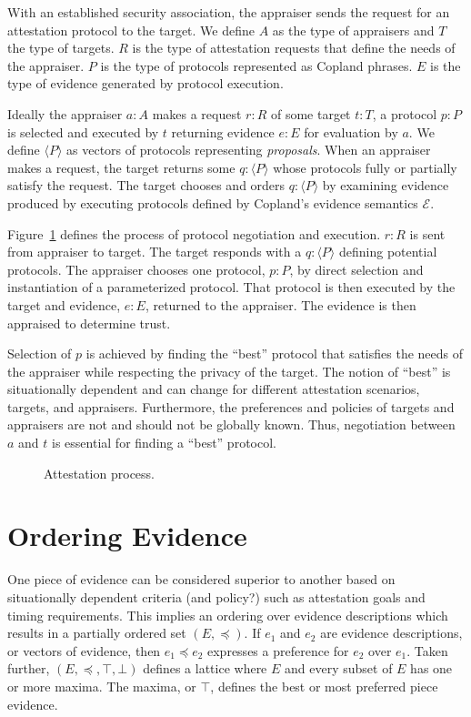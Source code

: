 \documentclass[sigconf,authordraft]{acmart}
\begin{document}
With an established security association, the appraiser sends the request for an attestation protocol to the target.  We
define $A$ as the type of appraisers and $T$ the type of targets.  $R$
is the type of attestation requests that define the needs of the
appraiser.  $P$ is the type of protocols represented as Copland
phrases.  $E$ is the type of evidence generated by protocol execution.

Ideally the appraiser $a:A$ makes a request $r:R$ of some target
$t:T$, a protocol $p:P$ is selected and executed by $t$ returning
evidence $e:E$ for evaluation by $a$. We define $\langle P \rangle$ as
vectors of protocols representing \emph{proposals}.  When an appraiser
makes a request, the target returns some $q:\langle P \rangle$ whose
protocols fully or partially satisfy the request. The target chooses
and orders $q:\langle P\rangle$ by examining evidence produced by
executing protocols defined by Copland's evidence semantics
$\mathcal{E}$.

Figure~\ref{fig:sequence-fig} defines the process of protocol
negotiation and execution.  $r:R$ is sent from appraiser to target.
The target responds with a $q:\langle P\rangle$ defining potential
protocols.  The appraiser chooses one protocol, $p:P$, by direct
selection and instantiation of a parameterized protocol.  That
protocol is then executed by the target and evidence, $e:E$, returned
to the appraiser.  The evidence is then appraised to determine trust.

Selection of $p$ is achieved by finding the ``best'' protocol that
satisfies the needs of the appraiser while respecting the privacy of
the target. The notion of ``best'' is situationally dependent and can
change for different attestation scenarios, targets, and appraisers.
Furthermore, the preferences and policies of targets and appraisers
are not and should not be globally known.  Thus, negotiation between
$a$ and $t$ is essential for finding a ``best'' protocol.

\begin{figure}[hbtp]
  \centering 
  \caption[Attestation process]{Attestation process.}
  \label{fig:sequence-fig}
\end{figure}

\section{Ordering Evidence}

One piece of evidence can be considered superior to another based on situationally dependent criteria (and policy?) such as attestation goals and timing requirements. This implies an ordering over evidence descriptions which results in a partially ordered set $(E,\preceq)$. If $e_1$ and $e_2$ are evidence descriptions, or vectors of evidence, then $e_1\preceq e_2$ expresses a preference for $e_2$ over $e_1$. Taken further, $(E,\preceq,\top,\bot)$ defines a lattice where $E$ and every subset of $E$ has one or more maxima.  The maxima, or $\top$, defines the best or most preferred piece evidence.
\end{document}
